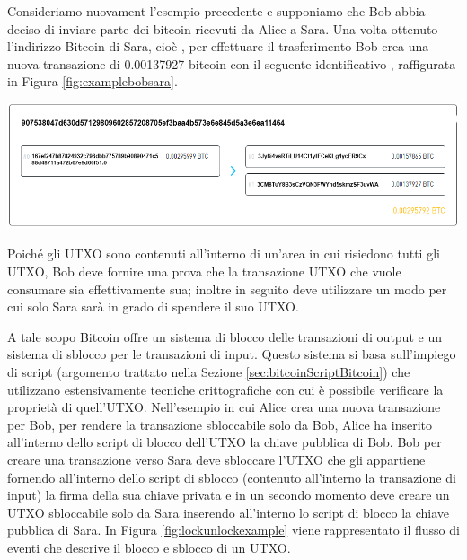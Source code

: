 \begin{example}
Consideriamo nuovament l'esempio precedente  e supponiamo che Bob abbia deciso di inviare parte dei bitcoin ricevuti da Alice a Sara. Una volta ottenuto l’indirizzo Bitcoin di Sara, cioè , per effettuare il trasferimento Bob  crea una nuova transazione di 0.00137927 bitcoin con il seguente identificativo , raffigurata in Figura \ref{fig:examplebobsara}.

{\centering
\vspace{15pt}
\includegraphics[scale=0.35]{images/example_bob_sara.png}
\vspace{10pt}
\par}


Poiché gli UTXO sono contenuti all’interno di un'area in cui risiedono tutti gli UTXO, Bob deve fornire una prova che la transazione UTXO che vuole consumare sia effettivamente sua; inoltre in seguito deve utilizzare un modo per cui solo Sara  sarà in grado di spendere il suo UTXO.

A tale scopo Bitcoin offre un sistema di blocco delle transazioni di output e un sistema di sblocco per le transazioni di input.  Questo sistema si basa sull'impiego di script (argomento trattato nella Sezione \ref{sec:bitcoinScriptBitcoin}) che utilizzano estensivamente tecniche crittografiche con cui è possibile verificare la proprietà di quell'UTXO.
Nell'esempio in cui Alice crea una nuova transazione per Bob, per rendere la transazione sbloccabile solo da Bob, Alice ha inserito all’interno dello script di blocco dell’UTXO la chiave pubblica di Bob.\newline
Bob per creare una transazione verso Sara deve sbloccare l’UTXO che gli appartiene fornendo all’interno dello script di sblocco (contenuto all’interno la transazione di input) la firma della sua chiave privata e in un secondo momento deve creare un UTXO sbloccabile solo da Sara inserendo all’interno lo script di blocco la chiave pubblica di Sara.\newline
In Figura \ref{fig:lockunlockexample} viene rappresentato il flusso di eventi che descrive il blocco e sblocco di un UTXO.


\end{example}
